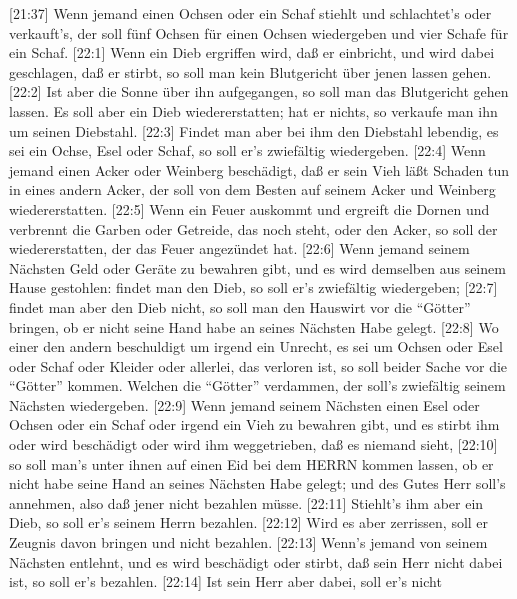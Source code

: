  {[}21:37{]} Wenn jemand einen Ochsen oder ein Schaf stiehlt
und schlachtet's oder verkauft's, der soll fünf Ochsen für einen Ochsen
wiedergeben und vier Schafe für ein Schaf.  {[}22:1{]} Wenn
ein Dieb ergriffen wird, daß er einbricht, und wird dabei geschlagen,
daß er stirbt, so soll man kein Blutgericht über jenen lassen gehen.
 {[}22:2{]} Ist aber die Sonne über ihn aufgegangen, so soll
man das Blutgericht gehen lassen. Es soll aber ein Dieb wiedererstatten;
hat er nichts, so verkaufe man ihn um seinen Diebstahl. 
{[}22:3{]} Findet man aber bei ihm den Diebstahl lebendig, es sei ein
Ochse, Esel oder Schaf, so soll er's zwiefältig wiedergeben.
 {[}22:4{]} Wenn jemand einen Acker oder Weinberg
beschädigt, daß er sein Vieh läßt Schaden tun in eines andern Acker, der
soll von dem Besten auf seinem Acker und Weinberg wiedererstatten.
 {[}22:5{]} Wenn ein Feuer auskommt und ergreift die Dornen
und verbrennt die Garben oder Getreide, das noch steht, oder den Acker,
so soll der wiedererstatten, der das Feuer angezündet hat. 
{[}22:6{]} Wenn jemand seinem Nächsten Geld oder Geräte zu bewahren
gibt, und es wird demselben aus seinem Hause gestohlen: findet man den
Dieb, so soll er's zwiefältig wiedergeben;  {[}22:7{]}
findet man aber den Dieb nicht, so soll man den Hauswirt vor die
``Götter'' bringen, ob er nicht seine Hand habe an seines Nächsten Habe
gelegt.  {[}22:8{]} Wo einer den andern beschuldigt um
irgend ein Unrecht, es sei um Ochsen oder Esel oder Schaf oder Kleider
oder allerlei, das verloren ist, so soll beider Sache vor die ``Götter''
kommen. Welchen die ``Götter'' verdammen, der soll's zwiefältig seinem
Nächsten wiedergeben.  {[}22:9{]} Wenn jemand seinem
Nächsten einen Esel oder Ochsen oder ein Schaf oder irgend ein Vieh zu
bewahren gibt, und es stirbt ihm oder wird beschädigt oder wird ihm
weggetrieben, daß es niemand sieht,  {[}22:10{]} so soll
man's unter ihnen auf einen Eid bei dem HERRN kommen lassen, ob er nicht
habe seine Hand an seines Nächsten Habe gelegt; und des Gutes Herr
soll's annehmen, also daß jener nicht bezahlen müsse. 
{[}22:11{]} Stiehlt's ihm aber ein Dieb, so soll er's seinem Herrn
bezahlen.  {[}22:12{]} Wird es aber zerrissen, soll er
Zeugnis davon bringen und nicht bezahlen.  {[}22:13{]}
Wenn's jemand von seinem Nächsten entlehnt, und es wird beschädigt oder
stirbt, daß sein Herr nicht dabei ist, so soll er's bezahlen.
 {[}22:14{]} Ist sein Herr aber dabei, soll er's nicht

